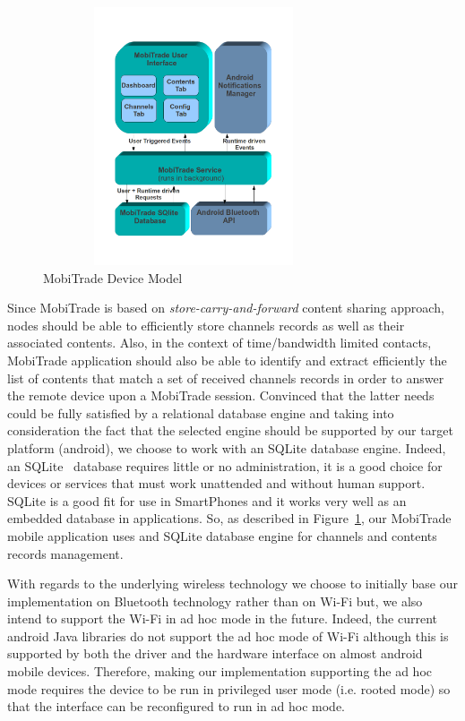 \begin{figure}[!h]
\centering
\includegraphics[width=3.5in,height=3in]{Chapitre6/MobiTradeCommunicationArchitecture.png}
\caption{MobiTrade Device Model}
\label{MobiTrade-application}
\end{figure}

Since MobiTrade is based on \emph{store-carry-and-forward} content sharing approach, nodes should be able to efficiently store channels records as well as their associated contents. Also, in the context of time/bandwidth limited contacts, MobiTrade application should also be able to identify and extract efficiently the list of contents that match a set of received channels records in order to answer the remote device upon a MobiTrade session. Convinced that the latter needs could be fully satisfied by a relational database engine and taking into consideration the fact that the selected engine should be supported by our target platform (android), we choose to work with an SQLite database engine. Indeed, an SQLite~\cite{SQLite} database requires little or no administration, it is a good choice for devices or services that must work unattended and without human support. SQLite is a good fit for use in SmartPhones and it works very well as an embedded database in applications. So, as described in Figure~\ref{MobiTrade-application}, our MobiTrade mobile application uses and SQLite database engine for channels and contents records management.

With regards to the underlying wireless technology we choose to initially base our implementation on Bluetooth technology rather than on Wi-Fi but, we also intend to support the Wi-Fi in ad hoc mode in the future. Indeed, the current android Java libraries do not support the ad hoc mode of Wi-Fi although this is supported by both the driver and the hardware interface on almost android mobile devices. Therefore, making our implementation supporting the ad hoc mode requires the device to be run in privileged user mode (i.e. rooted mode) so that the interface can be reconfigured to run in ad hoc mode.

